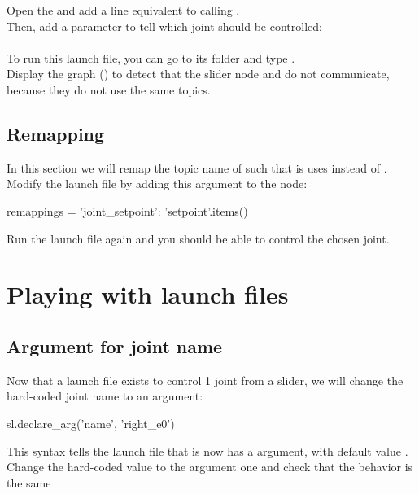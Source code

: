 \documentclass{ecnreport}
\begin{document}
Open the  and add a line equivalent to calling .\\
Then, add a parameter to tell which joint should be controlled:\\\\

To run this launch file, you can go to its folder and type .\\
Display the graph () to detect that the slider node and  do not communicate, because they do not use the same topics.

\subsection{Remapping}

In this section we will remap the topic name of  such that is uses  instead of .\\

Modify the launch file by adding this argument to the  node:

\begin{pythoncodelarge}
remappings = {'joint_setpoint': 'setpoint'}.items()
\end{pythoncodelarge}
Run the launch file again and you should be able to control the chosen joint.

\section{Playing with launch files}

\subsection{Argument for joint name}

Now that a launch file exists to control 1 joint from a slider, we will change the hard-coded joint name to an argument:
\begin{pythoncodelarge}
sl.declare_arg('name', 'right_e0')
\end{pythoncodelarge}
This syntax tells the launch file that is now has a  argument, with default value .\\

Change the hard-coded value to the argument one  and check that the behavior is the same\\
\end{document}
